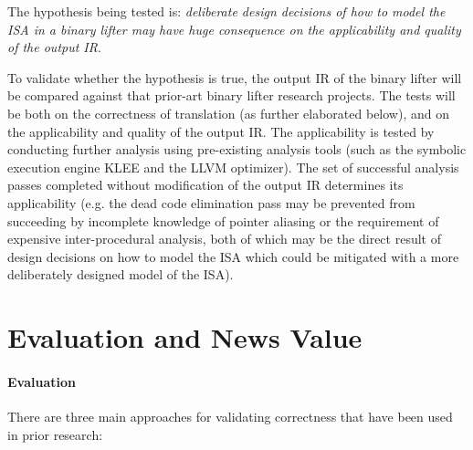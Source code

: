 \documentclass[12pt, a4paper]{article}
\begin{document}
The hypothesis being tested is: \textit{deliberate design decisions of how to model the ISA in a binary lifter may have huge consequence on the applicability and quality of the output IR}.

To validate whether the hypothesis is true, the output IR of the binary lifter will be compared against that prior-art binary lifter research projects. The tests will be both on the correctness of translation (as further elaborated below), and on the applicability and quality of the output IR. The applicability is tested by conducting further analysis using pre-existing analysis tools (such as the symbolic execution engine KLEE and the LLVM optimizer). The set of successful analysis passes completed without modification of the output IR determines its applicability (e.g. the dead code elimination pass may be prevented from succeeding by incomplete knowledge of pointer aliasing or the requirement of expensive inter-procedural analysis, both of which may be the direct result of design decisions on how to model the ISA which could be mitigated with a more deliberately designed model of the ISA).


\section{Evaluation and News Value}


\paragraph{Evaluation}

There are three main approaches for validating correctness that have been used in prior research:
\end{document}
